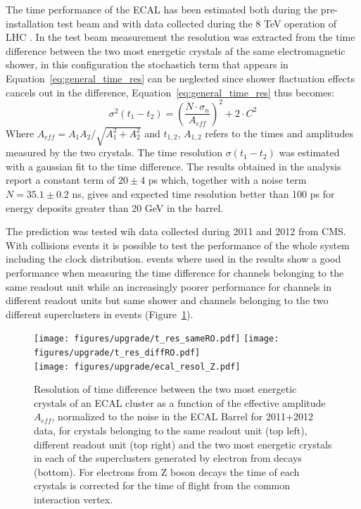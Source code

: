 The time performance of the ECAL has been estimated both during the pre-installation test beam \cite{ecal_time_reco}
and with data collected during the 8 TeV operation of LHC \cite{delRe_time_ecal}.
In the test beam measurement the resolution was extracted from the time difference between the two most energetic crystals
af the same electromagnetic shower, in this configuration the stochastich term that appears in Equation~\ref{eq:general_time_res}
can be neglected since shower flactuation effects cancels out in the difference, Equation~\ref{eq:general_time_res} thus becomes:
\begin{equation}
  \sigma^2(t_1 - t_2) = \left( \frac{N\cdot\sigma_n}{A_{eff}} \right)^2 + 2 \cdot C^2
\end{equation}
\label{eq:ecal_time_res}
Where $A_{eff} = A_1A_2/\sqrt{A_1^2+A_2^2}$ and $t_{1,2}$, $A_{1,2}$ refers to the times and amplitudes measured by the two crystals. 
The time resolution $\sigma(t_1-t_2)$ was estimated with a gaussian fit to the time difference.
The results obtained in the analysis report a constant term of $20 \pm 4$ ps which, together with a noise term $N = 35.1\pm 0.2$ ns,
gives and expected time resolution better than 100 ps for energy deposits greater than 20 GeV in the barrel.

The prediction was tested wih data collected during 2011 and 2012 from CMS. With collisions events it is possible to
test the performance of the whole system including the clock distribution. \Zee events where used in \cite{delRe_time_ecal}
the results show a good performance when measuring the time difference for channels belonging to the same readout unit while
an increasingly poorer performance for channels in different readout units but same shower and channels belonging to
the two different superclusters in \Zee events (Figure~\ref{fig:ecal_runI_time}).

\begin{figure}[h!]
  \centering
  \texttt{[image: figures/upgrade/t\_res\_sameRO.pdf]}
  \texttt{[image: figures/upgrade/t\_res\_diffRO.pdf]}\\
  \texttt{[image: figures/upgrade/ecal\_resol\_Z.pdf]}
  \caption{Resolution of time difference between the two most energetic crystals of an ECAL cluster as a function of the
    effective amplitude $A_{eff}$, normalized to the noise in the ECAL Barrel for 2011+2012 data,
    for crystals belonging to the same readout unit (top left), different readout unit (top right) and the two most
    energetic crystals in each of the superclusters generated by electron from \Zee decays (bottom).
    For electrons from Z boson decays the time of each crystals is corrected for the time of flight from the common
  interaction vertex.}
  \label{fig:ecal_runI_time}
\end{figure}


